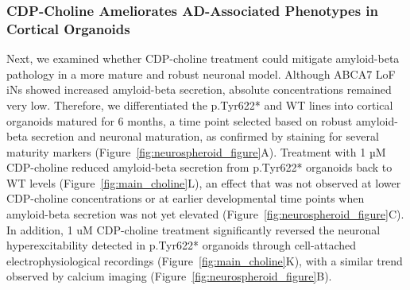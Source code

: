 \subsubsection{CDP-Choline Ameliorates AD-Associated Phenotypes in Cortical Organoids}
Next, we examined whether CDP-choline treatment could mitigate amyloid-beta pathology in a more mature and robust neuronal model. Although ABCA7 LoF iNs showed increased amyloid-beta secretion, absolute concentrations remained very low. Therefore, we differentiated the p.Tyr622* and WT lines into cortical organoids matured for 6 months, a time point selected based on robust amyloid-beta secretion and neuronal maturation, as confirmed by staining for several maturity markers (Figure~\ref{fig:neurospheroid_figure}A). Treatment with 1 µM CDP-choline reduced amyloid-beta secretion from p.Tyr622* organoids back to WT levels (Figure~\ref{fig:main_choline}L), an effect that was not observed at lower CDP-choline concentrations or at earlier developmental time points when amyloid-beta secretion was not yet elevated (Figure~\ref{fig:neurospheroid_figure}C). In addition, 1 uM CDP-choline treatment significantly reversed the neuronal hyperexcitability detected in  p.Tyr622* organoids through cell-attached electrophysiological recordings (Figure~\ref{fig:main_choline}K), with a similar trend observed by calcium imaging (Figure~\ref{fig:neurospheroid_figure}B).

    